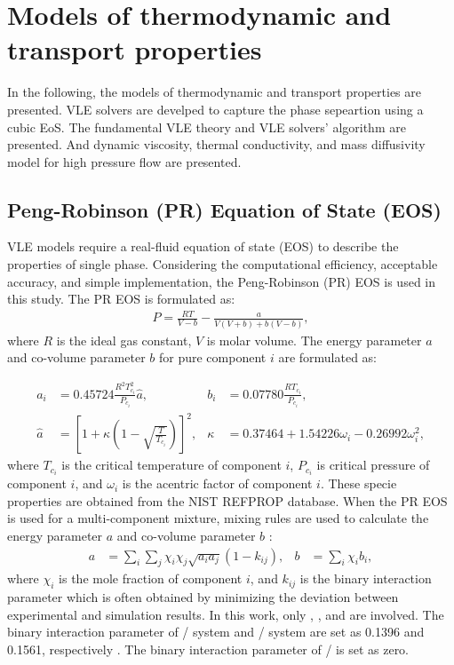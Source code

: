 \section{Models of thermodynamic and transport properties}
In the following, the models of thermodynamic and transport properties are presented. VLE solvers are develped to capture the phase sepeartion  using a cubic EoS. The fundamental VLE theory and VLE solvers' algorithm are presented. And dynamic viscosity, thermal conductivity, and mass diffusivity model for high pressure flow are presented.

\subsection{Peng-Robinson (PR) Equation of State (EOS)}
VLE models require a real-fluid equation of state (EOS) to describe the properties of single phase. Considering the computational efficiency, acceptable accuracy, and simple implementation, the Peng-Robinson (PR) EOS \cite{peng1976new} is used in this study. The PR EOS is formulated as:
\begin{align}
    P=\frac{RT}{V-b}-\frac{a}{V\left(V+b\right)+b\left(V-b\right)}, %
    \label{eq:preos}
\end{align}
where $R$ is the ideal gas constant, $V$ is molar volume. The energy parameter $a$ and co-volume parameter $b$ for pure component $i$ are formulated as:

\begin{align}
    a_i &= 0.45724\frac{R^2 T_{c_i}^2}{P_{c_i}} \hat{a} , &b_i&=0.07780\frac{RT_{c_i}}{P_{c_i}} \label{eq:ab},\\
    \hat{a}&=\left[1+\kappa\left(1-\sqrt{\frac{T}{T_{c_i}}}\right)\right]^2, &\kappa&=0.37464+1.54226\omega_i-0.26992\omega_i^2,
\end{align}
where $T_{c_i}$ is the critical temperature of component $i$, $P_{c_i}$ is critical pressure of component $i$, and $\omega_i$ is the acentric factor of component $i$. These specie properties are obtained from the NIST REFPROP database. When the PR EOS is used for a multi-component mixture, mixing rules are used to calculate the energy parameter $a$ and co-volume parameter $b$ \cite{reid1977properties}:
\begin{align}
a&=\sum_i\sum_j\chi_i\chi_j\sqrt{a_ia_j}(1-k_{ij}),& b&=\sum_i\chi_i b_i,\label{eq:mix}
\end{align}
where $\chi_i$ is the mole fraction of component $i$, and $k_{ij}$ is the binary interaction parameter which is often obtained by minimizing the deviation between experimental and simulation results. In this work, only , , and  are involved. The binary interaction parameter of / system and / system are set as 0.1396 and 0.1561, respectively \cite{eliosa2009vapor,garcia2011vapor}. The binary interaction parameter of / is set as zero.

